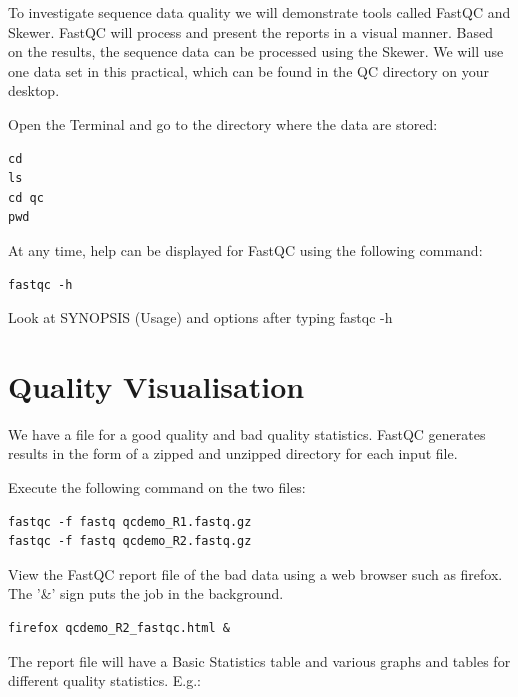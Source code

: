 \begin{information}
To investigate sequence data quality we will demonstrate tools called FastQC
and Skewer. FastQC will process and present the reports in a visual manner.
Based on the results, the sequence data can be processed using the Skewer.
We will use one data set in this practical, which can be found in the QC
directory on your desktop.
\end{information}

\begin{steps}

Open the Terminal and go to the directory where the data are stored:
\begin{lstlisting}
cd
ls
cd qc
pwd
\end{lstlisting}

At any time, help can be displayed for FastQC using the following command:
\begin{lstlisting}
fastqc -h
\end{lstlisting}

Look at SYNOPSIS (Usage) and options after typing fastqc -h 

\end{steps}

\section{Quality Visualisation}

\begin{information}
We have a file for a good quality and bad quality statistics. FastQC generates
results in the form of a zipped and unzipped directory for each input file.
\end{information}

\begin{steps}
Execute the following command on the two files:
\begin{lstlisting}
fastqc -f fastq qcdemo_R1.fastq.gz
fastqc -f fastq qcdemo_R2.fastq.gz
\end{lstlisting}

View the FastQC report file of the bad data using a web browser such as
firefox. The '\&' sign puts the job in the background.

\begin{lstlisting}
firefox qcdemo_R2_fastqc.html &
\end{lstlisting}

\end{steps}

\begin{note}
The report file will have a Basic Statistics table and various graphs and tables
for different quality statistics. E.g.:
\end{note}

